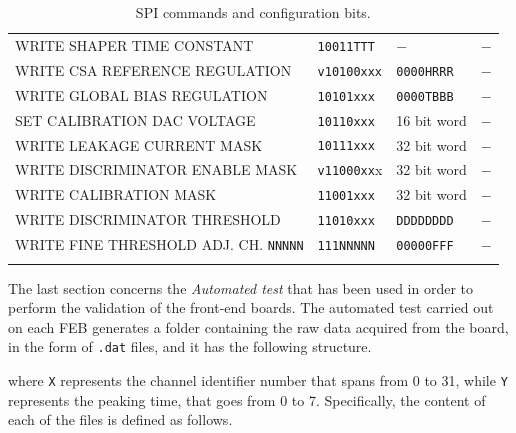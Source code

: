 \begin{table}[h!]
{\begin{tabular}{l l l l}
            WRITE SHAPER TIME CONSTANT & \texttt{10011TTT} & $\minus$ & $\minus$ \T\B \\
            WRITE CSA REFERENCE REGULATION & \texttt{v10100xxx} & \texttt{0000HRRR} & $\minus$ \T\B \\
            WRITE GLOBAL BIAS REGULATION & \texttt{10101xxx} & \texttt{0000TBBB} & $\minus$ \T\B \\
            SET CALIBRATION DAC VOLTAGE & \texttt{10110xxx} & 16 bit word & $\minus$ \T\B \\
            WRITE LEAKAGE CURRENT MASK & \texttt{10111xxx} & 32 bit word & $\minus$ \T\B \\
            WRITE DISCRIMINATOR ENABLE MASK & \texttt{v11000xx}x & 32 bit word & $\minus$ \T\B \\
            WRITE CALIBRATION MASK & \texttt{11001xxx} & 32 bit word & $\minus$ \T\B \\
            WRITE DISCRIMINATOR THRESHOLD & \texttt{11010xxx} & \texttt{DDDDDDDD} & $\minus$ \T\B \\
            WRITE FINE THRESHOLD ADJ. CH. \texttt{NNNNN} & \texttt{111NNNNN} & \texttt{00000FFF} & $\minus$ \T\B \\
            \Xhline{2\arrayrulewidth}
        \end{tabular}
    }
    \caption{SPI commands and configuration bits.}
    \label{tabSPIcommand}
\end{table}

\par
The last section concerns the \textit{Automated test} that has been used in order to perform the validation of the front-end boards. The automated test carried out on each FEB generates a folder containing the raw data acquired from the board, in the form of \texttt{.dat} files, and it has the following structure.\\

\vspace{-0.3cm}

\noindent
where \texttt{X} represents the channel identifier number that spans from 0 to 31, while \texttt{Y} represents the peaking time, that goes from 0 to 7. Specifically, the content of each of the files is defined as follows.

